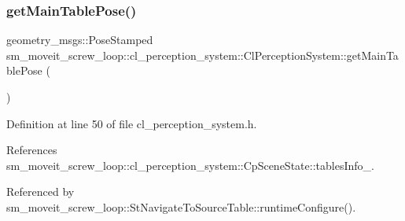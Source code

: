 \subsubsection{\texorpdfstring{get\+Main\+Table\+Pose()}{getMainTablePose()}}
{\footnotesize\ttfamily geometry\+\_\+msgs\+::\+Pose\+Stamped sm\+\_\+moveit\+\_\+screw\+\_\+loop\+::cl\+\_\+perception\+\_\+system\+::\+Cl\+Perception\+System\+::get\+Main\+Table\+Pose (\begin{DoxyParamCaption}{ }\end{DoxyParamCaption})\hspace{0.3cm}{\ttfamily [inline]}}



Definition at line 50 of file cl\+\_\+perception\+\_\+system.\+h.



References sm\+\_\+moveit\+\_\+screw\+\_\+loop\+::cl\+\_\+perception\+\_\+system\+::\+Cp\+Scene\+State\+::tables\+Info\+\_\+.



Referenced by sm\+\_\+moveit\+\_\+screw\+\_\+loop\+::\+St\+Navigate\+To\+Source\+Table\+::runtime\+Configure().


